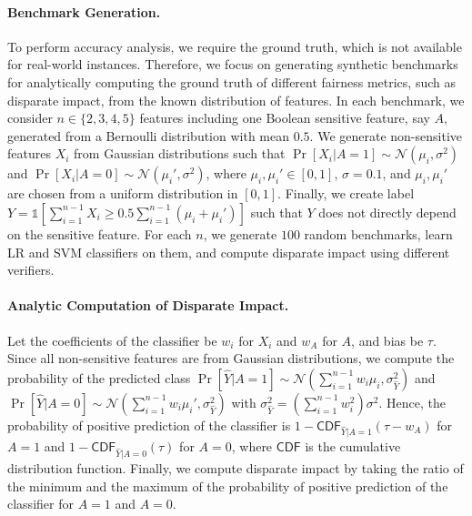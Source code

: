 \paragraph{Benchmark Generation.} To perform accuracy analysis, we require the ground truth, which is not available for real-world instances. Therefore, we focus on generating synthetic benchmarks for analytically computing the ground truth of different fairness metrics, such as disparate impact, from the known distribution of features. In each benchmark, we consider $ n \in \{2, 3, 4, 5\} $ features including one Boolean sensitive feature, say $ A $, generated from a Bernoulli distribution with mean $ 0.5 $.  We generate non-sensitive features $ X_i $ from Gaussian distributions such that   $ \Pr[X_i | A = 1] \sim \mathcal{N}(\mu_i, \sigma^2) $ and $ \Pr[X_i | A = 0] \sim \mathcal{N}(\mu_i', \sigma^2) $, where $ \mu_i, \mu_i' \in [0,1] $, $ \sigma = 0.1 $, and $ \mu_i, \mu_i' $ are chosen from a uniform distribution in $ [0,1] $. Finally, we create label $ Y = \mathds{1}[ \sum_{i=1}^{n-1} X_i \ge 0.5 \sum_{i=1}^{n-1} (\mu_i + \mu_i')] $ such that $ Y $ does not directly depend on the sensitive feature. For each $ n $, we generate $ 100 $ random benchmarks, learn LR and SVM classifiers on them, and compute disparate impact using different verifiers.

  
\paragraph{Analytic Computation of  Disparate Impact.} Let the coefficients of the classifier be $ w_i $ for $ X_i $ and $ w_A $ for $ A $, and bias be $ \tau $. Since all non-sensitive features are from Gaussian distributions, we compute the probability of the predicted class $ \Pr[\widehat{Y} | A = 1]  \sim \mathcal{N}(\sum_{i=1}^{n-1}w_i\mu_i, \sigma_{\widehat{Y}}^2) $ and $ \Pr[\widehat{Y} | A = 0]  \sim \mathcal{N}(\sum_{i=1}^{n-1}w_i\mu_i', \sigma_{\widehat{Y}}^2) $ with $ \sigma_{\widehat{Y}}^2 =   (\sum_{i=1}^{n-1}w_i^2)\sigma^2 $. Hence, the probability of positive prediction of the classifier  is $  1 - \mathsf{CDF}_{\widehat{Y}| A =1}(\tau - w_A) $ for $ A = 1 $ and $  1 - \mathsf{CDF}_{\widehat{Y}|A=0}(\tau) $ for $ A = 0 $, where $ \mathsf{CDF} $ is the cumulative distribution function. Finally, we compute disparate impact by taking the ratio of the minimum and the maximum of the probability of positive prediction of the classifier for $ A = 1 $ and $ A = 0 $.



